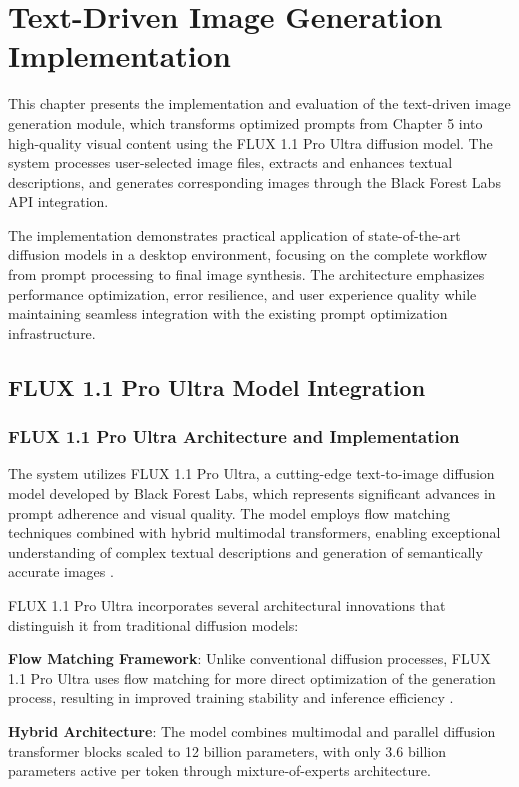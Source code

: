 \chapter{Text-Driven Image Generation Implementation}

This chapter presents the implementation and evaluation of the text-driven image generation module, which transforms optimized prompts from Chapter 5 into high-quality visual content using the FLUX 1.1 Pro Ultra diffusion model. The system processes user-selected image files, extracts and enhances textual descriptions, and generates corresponding images through the Black Forest Labs API integration.

The implementation demonstrates practical application of state-of-the-art diffusion models in a desktop environment, focusing on the complete workflow from prompt processing to final image synthesis. The architecture emphasizes performance optimization, error resilience, and user experience quality while maintaining seamless integration with the existing prompt optimization infrastructure.

\section{FLUX 1.1 Pro Ultra Model Integration}

\subsection{FLUX 1.1 Pro Ultra Architecture and Implementation}

The system utilizes FLUX 1.1 Pro Ultra, a cutting-edge text-to-image diffusion model developed by Black Forest Labs, which represents significant advances in prompt adherence and visual quality. The model employs flow matching techniques combined with hybrid multimodal transformers, enabling exceptional understanding of complex textual descriptions and generation of semantically accurate images \cite{zhang2024flux, esser2024flux}.

FLUX 1.1 Pro Ultra incorporates several architectural innovations that distinguish it from traditional diffusion models:

\textbf{Flow Matching Framework}: Unlike conventional diffusion processes, FLUX 1.1 Pro Ultra uses flow matching for more direct optimization of the generation process, resulting in improved training stability and inference efficiency \cite{liu2023flow}.

\textbf{Hybrid Architecture}: The model combines multimodal and parallel diffusion transformer blocks scaled to 12 billion parameters, with only 3.6 billion parameters active per token through mixture-of-experts architecture.

